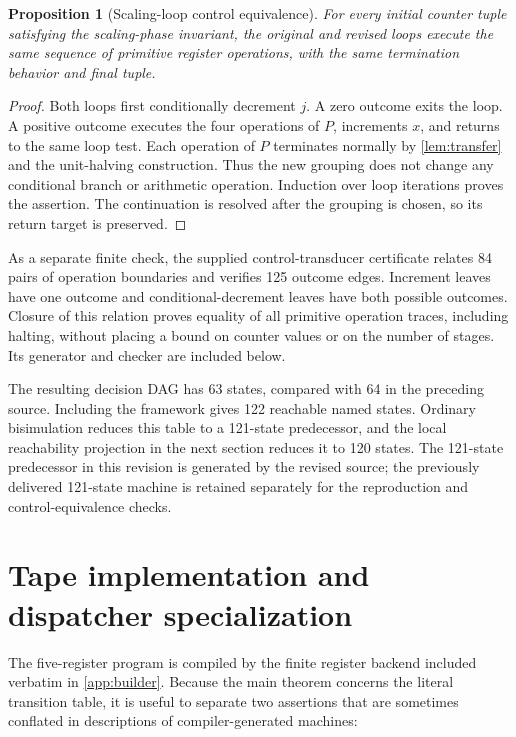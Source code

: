 \documentclass[10pt]{article}
\newtheorem{proposition}[theorem]{Proposition}
\theoremstyle{definition}
\begin{document}
\begin{proposition}[Scaling-loop control equivalence]
\label{prop:tailsharing}
For every initial counter tuple satisfying the scaling-phase invariant,
the original and revised loops execute the same sequence of primitive
register operations, with the same termination behavior and final tuple.
\end{proposition}

\begin{proof}
Both loops first conditionally decrement $j$. A zero outcome exits the loop.
A positive outcome executes the four operations of $P$, increments $x$, and
returns to the same loop test. Each operation of $P$ terminates normally by
\cref{lem:transfer} and the unit-halving construction. Thus the new
grouping does not change any conditional branch or arithmetic operation.
Induction over loop iterations proves the assertion. The continuation is
resolved after the grouping is chosen, so its return target is preserved.
\end{proof}

As a separate finite check, the supplied control-transducer certificate
relates 84 pairs of operation boundaries and verifies 125 outcome edges.
Increment leaves have one outcome and conditional-decrement leaves have both
possible outcomes. Closure of this relation proves equality of all primitive
operation traces, including halting, without placing a bound on counter values
or on the number of stages. Its generator and checker are included below.

The resulting decision DAG has 63 states, compared with 64 in the preceding
source. Including the framework gives 122 reachable named states. Ordinary
bisimulation reduces this table to a 121-state predecessor, and the local
reachability projection in the next section reduces it to 120 states. The
121-state predecessor in this revision is generated by the revised source;
the previously delivered 121-state machine is retained separately for the
reproduction and control-equivalence checks.

\section{Tape implementation and dispatcher specialization}
\label{sec:backend}

The five-register program is compiled by the finite register backend included
verbatim in \cref{app:builder}.  Because the main theorem concerns the literal
transition table, it is useful to separate two assertions that are sometimes
conflated in descriptions of compiler-generated machines:
\end{document}
